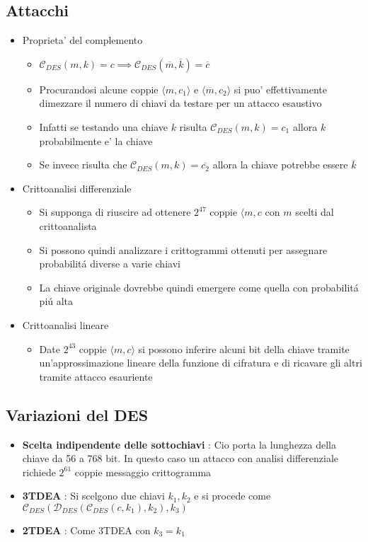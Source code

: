 \subsection{Attacchi}
\begin{itemize}
    \item Proprieta' del complemento
    \begin{itemize}
        \item $\mathcal{C}_{DES}(m, k) = c \implies \mathcal{C}_{DES}(\overline{m}, \overline{k}) = \overline{c}$
        \item Procurandosi alcune coppie $\langle m, c_1 \rangle$ e $\langle \overline{m}, c_2 \rangle$ si puo' effettivamente dimezzare il numero di chiavi da testare per un attacco esaustivo
        \item Infatti se testando una chiave $k$ risulta $\mathcal{C}_{DES}(m, k) = c_1$ allora $k$ probabilmente e' la chiave
        \item Se invece risulta che  $\mathcal{C}_{DES}(m, k) = \overline{c_2}$ allora la chiave potrebbe essere $\overline{k}$
    \end{itemize}
    \item Crittoanalisi differenziale
    \begin{itemize}
        \item Si supponga di riuscire ad ottenere $2^{47}$ coppie $\langle m, c$ con $m$ scelti dal crittoanalista
        \item Si possono quindi analizzare i crittogrammi ottenuti per assegnare probabilit\'a diverse a varie chiavi
        \item La chiave originale dovrebbe quindi emergere come quella con probabilit\'a pi\'u alta
    \end{itemize}
    \newpage
    \item Crittoanalisi lineare
    \begin{itemize}
        \item Date $2^{43}$ coppie $\langle m, c \rangle$ si possono inferire alcuni bit della chiave tramite un'approssimazione lineare della funzione di cifratura e di ricavare gli altri tramite attacco esauriente
    \end{itemize}
\end{itemize}

\subsection{Variazioni del DES}

\begin{itemize}
    \item \textbf{Scelta indipendente delle sottochiavi} : Cio porta la lunghezza della chiave da 56 a 768 bit. In questo caso un attacco con analisi differenziale richiede $2^61$ coppie messaggio crittogramma
\item \textbf{3TDEA} : Si scelgono due chiavi $k_1, k_2$ e si procede come \\$\mathcal{C}_{DES}(\mathcal{D}_{DES}(\mathcal{C}_{DES}(c, k_1), k_2), k_3)$
\item \textbf{2TDEA} : Come 3TDEA con $k_3 = k_1$
\end{itemize}

